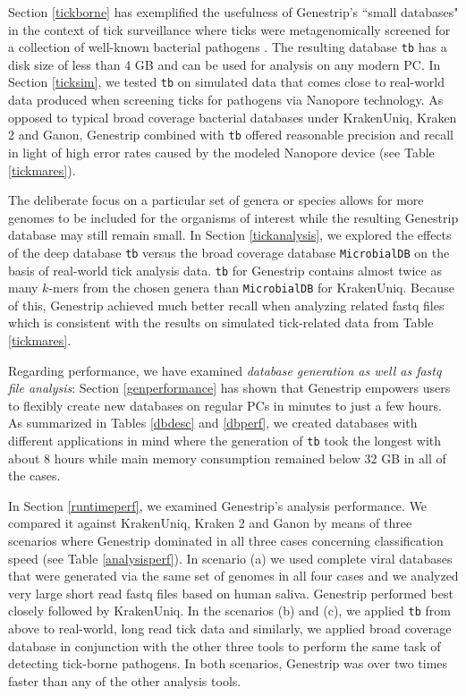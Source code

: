 \documentclass[pdflatex,sn-vancouver-num]{sn-jnl}
\begin{document}
    Section \ref{tickborne} has exemplified the usefulness of Genestrip's ``small databases" in the context of tick surveillance where ticks were metagenomically screened for a collection of well-known bacterial pathogens \citep{nanoporeticks}. The resulting database \texttt{tb} has a disk size of less than 4 GB and can be used for analysis on any modern PC. In Section \ref{ticksim}, we tested \texttt{tb} on simulated data that comes close to real-world data produced when screening ticks for pathogens via Nanopore technology. As opposed to typical broad coverage bacterial databases under KrakenUniq, Kraken 2 and Ganon, Genestrip combined with \texttt{tb} offered reasonable precision and recall in light of high error rates caused by the modeled Nanopore device (see Table \ref{tickmares}).
    
    The deliberate focus on a particular set of genera or species allows for more genomes to be included for the organisms of interest while the resulting Genestrip database may still remain small.
    In Section \ref{tickanalysis}, we explored the effects of the deep database \texttt{tb} versus the broad coverage database \texttt{MicrobialDB} on the basis of real-world tick analysis data. \texttt{tb} for Genestrip contains almost twice as many $k$-mers from the chosen genera than \texttt{MicrobialDB} for KrakenUniq. Because of this, Genestrip achieved much better recall when analyzing related fastq files which is consistent with the results on simulated tick-related data from Table \ref{tickmares}.
    
    Regarding performance, we have examined \emph{database generation as well as fastq file analysis}: Section \ref{genperformance} has shown that Genestrip empowers users to flexibly create new databases on regular PCs in minutes to just a few hours. As summarized in Tables \ref{dbdesc} and \ref{dbperf}, we created databases with different applications in mind where the generation of \texttt{tb} took the longest with about 8 hours while main memory consumption remained below 32 GB in all of the cases.
    
   In Section \ref{runtimeperf}, we examined Genestrip's analysis performance.
   We compared it against KrakenUniq, Kraken 2 and Ganon by means of three scenarios where Genestrip dominated in all three cases concerning classification speed (see Table \ref{analysisperf}). In scenario (a) we used complete viral databases that were generated via the same set of genomes in all four cases and we analyzed very large short read fastq files based on human saliva. Genestrip performed best closely followed by KrakenUniq. In the scenarios (b) and (c), we applied \texttt{tb} from above to real-world, long read tick data and similarly, we applied broad coverage database in conjunction with the other three tools to perform the same task of detecting tick-borne pathogens. In both scenarios, Genestrip was over two times faster than any of the other analysis tools.
   
\end{document}
